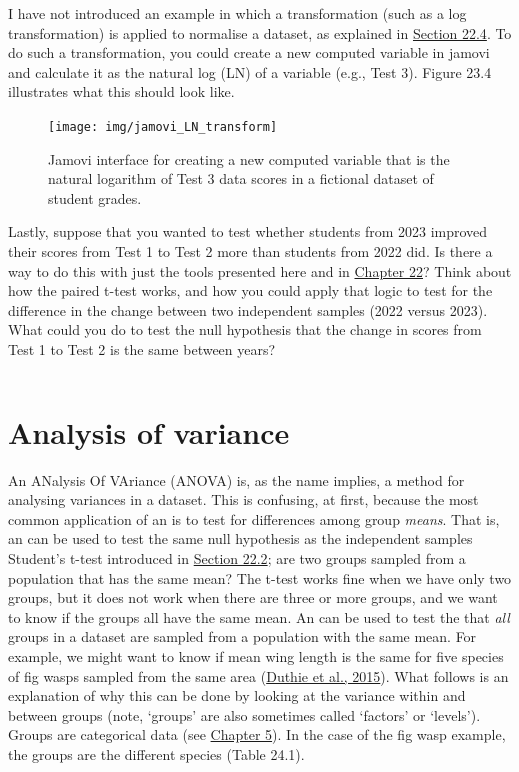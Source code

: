 \documentclass[
  openany]{krantz}
\begin{document}
I have not introduced an example in which a transformation (such as a log transformation) is applied to normalise a dataset, as explained in \protect\hyperlink{assumptions-of-t-tests}{Section 22.4}.
To do such a transformation, you could create a new computed variable in jamovi and calculate it as the natural log (LN) of a variable (e.g., Test 3).
Figure 23.4 illustrates what this should look like.

\begin{figure}
\texttt{[image: img/jamovi\_LN\_transform]} \caption{Jamovi interface for creating a new computed variable that is the natural logarithm of Test 3 data scores in a fictional dataset of student grades.}\label{fig:unnamed-chunk-93}
\end{figure}

Lastly, suppose that you wanted to test whether students from 2023 improved their scores from Test 1 to Test 2 more than students from 2022 did.
Is there a way to do this with just the tools presented here and in \protect\hyperlink{Chapter_22}{Chapter 22}?
Think about how the paired t-test works, and how you could apply that logic to test for the difference in the change between two independent samples (2022 versus 2023).
What could you do to test the null hypothesis that the change in scores from Test 1 to Test 2 is the same between years?

\begin{verbatim}
\end{verbatim}

\hypertarget{Chapter_24}{%
\chapter{Analysis of variance}\label{Chapter_24}}

An ANalysis Of VAriance (ANOVA) is, as the name implies, a method for analysing variances in a dataset.
This is confusing, at first, because the most common application of an  is to test for differences among group \emph{means}.
That is, an  can be used to test the same null hypothesis as the independent samples Student's t-test introduced in \protect\hyperlink{independent-samples-t-test}{Section 22.2}; are two groups sampled from a population that has the same mean?
The t-test works fine when we have only two groups, but it does not work when there are three or more groups, and we want to know if the groups all have the same mean.
An  can be used to test the  that \emph{all} groups in a dataset are sampled from a population with the same mean.
For example, we might want to know if mean wing length is the same for five species of fig wasps sampled from the same area (\protect\hyperlink{ref-Duthie2015b}{Duthie et al., 2015}).
What follows is an explanation of why this can be done by looking at the variance within and between groups (note, `groups' are also sometimes called `factors' or `levels').
Groups are categorical data (see \protect\hyperlink{Chapter_5}{Chapter 5}).
In the case of the fig wasp example, the groups are the different species (Table 24.1).
\end{document}
